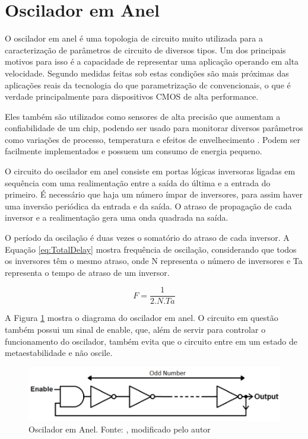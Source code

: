 \section{Oscilador em Anel}
O oscilador em anel é uma topologia de circuito muito utilizada para a caracterização de parâmetros de circuito de diversos tipos. Um dos principais motivos para isso é a capacidade de representar uma aplicação operando em alta velocidade. Segundo \cite{Bhushan} medidas feitas sob estas condições são mais próximas das aplicações reais da tecnologia do que parametrização dc convencionais, o que é verdade principalmente para dispositivos CMOS de alta performance.

Eles também são utilizados como sensores de alta precisão que aumentam a confiabilidade de um chip, podendo ser usado para monitorar diversos parâmetros como variações de processo, temperatura e efeitos de envelhecimento \cite{Sato}. Podem ser facilmente implementados e possuem um consumo de energia pequeno.

O circuito do oscilador em anel consiste em portas lógicas inversoras ligadas em sequência com uma realimentação entre a saída do última e a entrada do primeiro. É necessário que haja um número ímpar de inversores, para assim haver uma inversão periódica da entrada e da saída. O atraso de propagação de cada inversor e a realimentação gera uma onda quadrada na saída.

O período da oscilação é duas vezes o somatório do atraso de cada inversor. A Equação \ref{eq:TotalDelay} mostra frequência de oscilação, considerando que todos os inversores têm o mesmo atraso, onde N representa o número de inversores e Ta representa o tempo de atraso de um inversor.

\begin{equation}
    F = \frac{1}{2.N.Ta}
    \label{eq:TotalDelay}
\end{equation}
         
A Figura \ref{fig:RingOsc} mostra o diagrama do oscilador em anel. O circuito em questão também possui um sinal de enable, que, além de servir para controlar o funcionamento do oscilador, também evita que o circuito entre em um estado de metaestabilidade e não oscile.

\begin{figure}[H]
    \centering
    \includegraphics[width=\linewidth]{figures/RingOscModified.png}
    \caption{Oscilador em Anel. Fonte: \cite{Sparkfun}, modificado pelo autor}
    \label{fig:RingOsc}
\end{figure}


